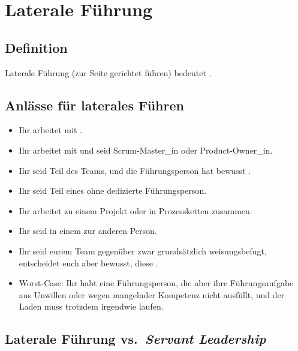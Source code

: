 \section{Laterale Führung}
\label{laterale-fuehrung}

\subsection{Definition}

Laterale Führung (\glqq zur Seite gerichtet führen\grqq) bedeutet .~\cite{kuhl-laterales-fuehren, fuehren-ohne-fuehrung, gtd-when-not-in-charge}

\subsection{Anlässe für laterales Führen}

\begin{itemize}
    \item Ihr arbeitet mit .
    \item Ihr arbeitet mit  und seid Scrum-Master\_in oder Product-Owner\_in.
    \item Ihr seid Teil des Teams, und die Führungsperson hat bewusst .
    \item Ihr seid Teil eines  ohne dedizierte Führungsperson.
    \item Ihr arbeitet  zu einem Projekt oder in Prozessketten zusammen.
    \item Ihr seid in einem  zur anderen Person.
    \item Ihr seid eurem Team gegenüber zwar grundsätzlich weisungsbefugt, entscheidet euch aber bewusst, diese .
    \item Worst-Case: Ihr habt eine Führungsperson, die aber ihre Führungsaufgabe aus Unwillen oder wegen mangelnder Kompetenz nicht ausfüllt, und der Laden muss trotzdem irgendwie laufen.
\end{itemize}

\subsection{Laterale Führung vs.~\emph{Servant Leadership}}

